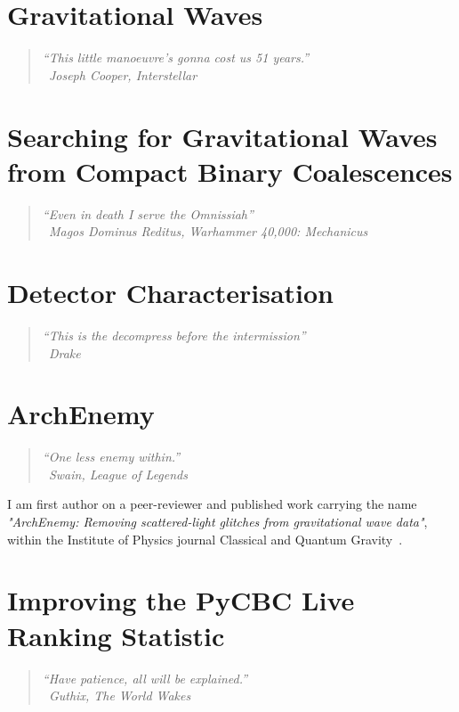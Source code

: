 \documentclass[12pt,twoside]{report} %
\newcommand{\chapterquote}[2]{
  \begin{quote}
    \color{mediumgray}\itshape #1 \\[1ex] %
    \raggedleft %
    \textemdash\ #2
  \end{quote}
}
\begin{document}
\chapter[Gravitational Waves]{\label{chapter:1-gravitational-waves}Gravitational Waves}
\chapterquote{``This little manoeuvre's gonna cost us 51 years.''}{Joseph Cooper, Interstellar}


\chapter[Searching for Gravitational-Waves from Compact Binary Coalescences]{\label{chapter:2-searches}Searching for Gravitational Waves from Compact Binary Coalescences}
\chapterquote{``Even in death I serve the Omnissiah''}{Magos Dominus Reditus, Warhammer 40,000: Mechanicus}


\chapter[Detector Characterisation]{\label{chapter:3-detchar}Detector Characterisation}
\chapterquote{``This is the decompress before the intermission''}{Drake}


\chapter[ArchEnemy]{\label{chapter:4-archenemy}ArchEnemy}
\chapterquote{``One less enemy within.''}{Swain, League of Legends}
I am first author on a peer-reviewer and published work carrying the name \textit{"ArchEnemy: Removing scattered-light glitches from gravitational wave data"}, within the Institute of Physics journal Classical and Quantum Gravity~\cite{ArchEnemy:2023}.
% 

\chapter[Improving the PyCBC Live Ranking Statistic]{\label{chapter:5-pycbc-live}Improving the PyCBC Live Ranking Statistic}
\chapterquote{``Have patience, all will be explained.''}{Guthix, The World Wakes}
% 

\end{document}
